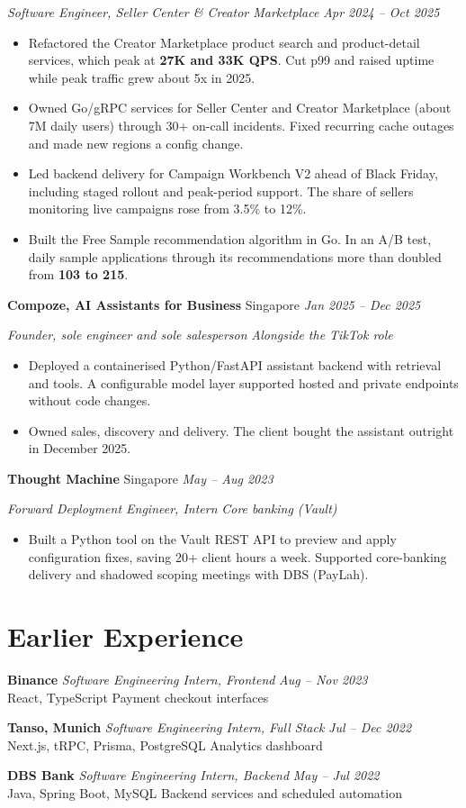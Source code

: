 \documentclass[11pt,a4paper]{article}
\newcommand{\subentry}[2]{%
  \vspace{2pt}
  \noindent\textit{#1} \hfill \textit{#2}
}
\newcommand{\companyheader}[3]{%
  \vspace{4pt}
  \noindent\textbf{#1} \hfill \textnormal{#2} \enspace\textbar\enspace \textit{#3}
}
\newcommand{\internline}[4]{%
  \vspace{2pt}
  \noindent\textbf{#1} \enspace\textbar\enspace \textit{#2} \hfill \textit{#4}\\[-2pt]
  \noindent #3\par
}
\begin{document}
\subentry{Software Engineer, Seller Center \& Creator Marketplace}{Apr 2024 -- Oct 2025}
\begin{itemize}
  \item Refactored the Creator Marketplace product search and product-detail services, which peak at \textbf{27K and 33K QPS}. Cut p99 and raised uptime while peak traffic grew about 5x in 2025.
  \item Owned Go/gRPC services for Seller Center and Creator Marketplace (about 7M daily users) through 30+ on-call incidents. Fixed recurring cache outages and made new regions a config change.
  \item Led backend delivery for Campaign Workbench V2 ahead of Black Friday, including staged rollout and peak-period support. The share of sellers monitoring live campaigns rose from 3.5\% to 12\%.
  \item Built the Free Sample recommendation algorithm in Go. In an A/B test, daily sample applications through its recommendations more than doubled from \textbf{103 to 215}.
\end{itemize}

\companyheader{Compoze, AI Assistants for Business}{Singapore}{Jan 2025 -- Dec 2025}

\subentry{Founder, sole engineer and sole salesperson}{Alongside the TikTok role}
\begin{itemize}
  \item Deployed a containerised Python/FastAPI assistant backend with retrieval and tools. A configurable model layer supported hosted and private endpoints without code changes.
  \item Owned sales, discovery and delivery. The client bought the assistant outright in December 2025.
\end{itemize}

\companyheader{Thought Machine}{Singapore}{May -- Aug 2023}

\subentry{Forward Deployment Engineer, Intern}{Core banking (Vault)}
\begin{itemize}
  \item Built a Python tool on the Vault REST API to preview and apply configuration fixes, saving 20+ client hours a week. Supported core-banking delivery and shadowed scoping meetings with DBS (PayLah).
\end{itemize}

\section{Earlier Experience}
\internline{Binance}{Software Engineering Intern, Frontend}{React, TypeScript \enspace\textbar\enspace Payment checkout interfaces}{Aug -- Nov 2023}
\internline{Tanso, Munich}{Software Engineering Intern, Full Stack}{Next.js, tRPC, Prisma, PostgreSQL \enspace\textbar\enspace Analytics dashboard}{Jul -- Dec 2022}
\internline{DBS Bank}{Software Engineering Intern, Backend}{Java, Spring Boot, MySQL \enspace\textbar\enspace Backend services and scheduled automation}{May -- Jul 2022}
\end{document}
